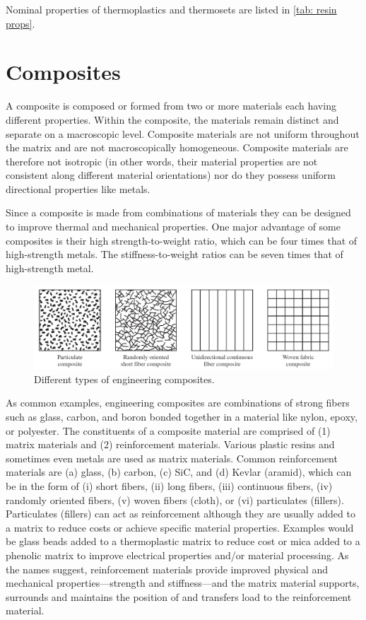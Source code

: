 \documentclass[
10pt,
a4paper,
openany,
svgnames,
]{book}
\begin{document}
Nominal properties of thermoplastics and thermosets are listed in \cref{tab: resin props}.

\section{Composites}

A composite is composed or formed from two or more materials each having different properties. Within the composite, the materials remain distinct and separate on a macroscopic level. Composite materials are not uniform throughout the matrix and are not macroscopically homogeneous. Composite materials are therefore not isotropic (in other words, their material properties are not consistent along different material orientations) nor do they possess uniform directional properties like metals.

Since a composite is made from combinations of materials they can be designed to improve thermal and mechanical properties. One major advantage of some composites is their high strength-to-weight ratio, which can be four times that of high-strength metals. The stiffness-to-weight ratios can be seven times that of high-strength metal.

\begin{figure}[h]
  \centering
  \includegraphics[width=\textwidth]{pictures/Material-selection/composites}
  \begin{tikzpicture}
  \end{tikzpicture}
  \caption{Different types of engineering composites. \cite{shigley2011shigley}}
\end{figure}

As common examples, engineering composites are combinations of strong fibers such as glass, carbon, and boron bonded together in a material like nylon, epoxy, or polyester. The constituents of a composite material are comprised of (1) matrix materials and (2) reinforcement materials. Various plastic resins and sometimes even metals are used as matrix materials. Common reinforcement materials are (a) glass, (b) carbon, (c) SiC, and (d) Kevlar (aramid), which can be in the form of (i) short fibers, (ii) long fibers, (iii) continuous fibers, (iv) randomly oriented fibers, (v) woven fibers (cloth), or (vi) particulates (fillers). Particulates (fillers) can act as reinforcement although they are usually added to a matrix to reduce costs or achieve specific material properties. Examples would be glass beads added to a thermoplastic matrix to reduce cost or mica added to a phenolic matrix to improve electrical properties and/or material processing. As the names suggest, reinforcement materials provide improved physical and mechanical properties—strength and stiffness—and the matrix material supports, surrounds and maintains the position of and transfers load to the reinforcement material.
\end{document}
